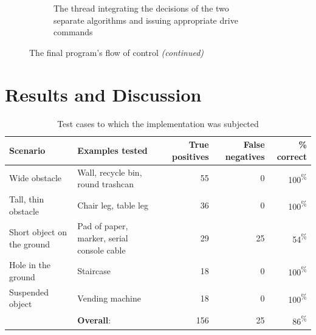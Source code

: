 \documentclass[12pt]{report}
\begin{document}
\begin{figure}
\begin{subfigure}{\textwidth}
\caption[Integration and drive control]{The thread integrating the decisions of the two separate algorithms and issuing appropriate drive commands}
\end{subfigure}
\captionsetup{list=false}
\caption{The final program's flow of control \textit{(continued)}}
\label{fig:runtimecont}
\end{figure}

\section{Results and Discussion}
\begin{table}[h]
\caption[Structured test cases]{Test cases to which the implementation was subjected}
\label{tab:tests}
\begin{center}
\begin{tabular}{| p{} | p{} | r | r | r |}
\hline
\scriptsize\textbf{Scenario} & \scriptsize\textbf{Examples tested} & \scriptsize\textbf{True positives} & \scriptsize\textbf{False negatives} & \scriptsize\textbf{\% correct} \\
\hline\hline
\scriptsize Wide obstacle & \scriptsize Wall, recycle bin, round trashcan & 55 & 0 & 100\textsuperscript{\%} \\
\hline
\scriptsize Tall, thin obstacle & \scriptsize Chair leg, table leg & 36 & 0 & 100\textsuperscript{\%} \\
\hline
\scriptsize Short object on the ground & \scriptsize Pad of paper, marker, serial console cable & 29 & 25 & 54\textsuperscript{\%} \\
\hline
\scriptsize Hole in the ground & \scriptsize Staircase & 18 & 0 & 100\textsuperscript{\%} \\
\hline
\scriptsize Suspended object & \scriptsize Vending machine & 18 & 0 & 100\textsuperscript{\%} \\
\hline\hline
& \scriptsize\textbf{Overall}: & 156 & 25 & 86\textsuperscript{\%} \\
\hline
\end{tabular}
\end{center}
\end{table}
\end{document}
